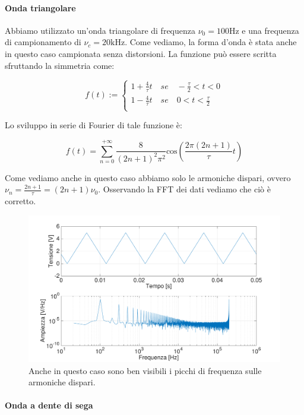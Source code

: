 \paragraph{Onda triangolare \newline}
Abbiamo utilizzato un'onda triangolare di frequenza $\nu_0=100 \si{\hertz}$ e una frequenza di campionamento di $\nu_c=20\si{\kilo\hertz}$. Come vediamo, la forma d'onda è stata anche in questo caso campionata senza distorsioni. La funzione può essere scritta sfruttando la simmetria come:

\begin{displaymath}
f(t):=
\begin{cases}
1+\frac{4}{\tau}t \quad se \quad -\frac{\tau}{2}<t<0 \\
1-\frac{4}{\tau}t \quad se \quad 0<t<\frac{\tau}{2} \\ 
\end{cases}
\end{displaymath}

Lo sviluppo in serie di Fourier di tale funzione è:

\begin{equation}
f(t)=\sum_{n=0}^{+\infty}\frac{8}{(2n+1)^2\pi^2}\mathrm{cos} \left(\frac{2\pi(2n+1)}{\tau}t\right)
\end{equation}

Come vediamo anche in questo caso abbiamo solo le armoniche dispari, ovvero $\nu_n=\frac{2n+1}{\tau}=(2n+1)\nu_0$. Osservando la FFT dei dati vediamo che ciò è corretto. 

\begin{figure}[H]
\centering
	\includegraphics[width=.63\textwidth]{../E13/latex/triangolare100hz@10000,200000.pdf}
	\caption{Anche in questo caso sono ben visibili i picchi di frequenza sulle armoniche dispari. }
	\label{triangolare}
\end{figure}

\paragraph{Onda a dente di sega \newline}

